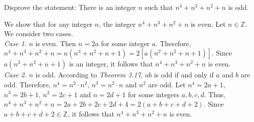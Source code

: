 \documentclass[12pt]{article}
\newcommand{\Z}{\mathbb{Z}}
\newenvironment{problem}[2][Problem]{\begin{trivlist}
		\item[\hskip \labelsep {\bfseries #1}\hskip \labelsep {\bfseries #2.}]}{\end{trivlist}}
\newenvironment{solution}[2][Solution]{\begin{trivlist}
		\item[\hskip \labelsep {\bfseries #1}\hskip \labelsep {\bfseries #2.}]}{\end{trivlist}}
\begin{document}
	\begin{problem}{51}
		Disprove the statement: There is an integer $n$ such that $n^{4}+n^{3}+n^{2}+n$ is odd.
		\begin{solution}{}
			We show that for any integer $n$, the integer $n^{4}+n^{3}+n^{2}+n$ is even. Let $n\in \Z$. We consider two cases.\\
			\textit{Case 1.} $n$ is even. Then $n =2a$ for some integer $a$. Therefore, $n^{4}+n^{3}+n^{2}+n = n(n^{3}+n^{2}+n+1) = 2[a(n^{2}+n^{2}+n+1)]$. Since $a(n^{2}+n^{2}+n+1)$ is an integer, it follows that $n^{4}+n^{3}+n^{2}+n$ is even.\\
			\textit{Case 2.} $n$ is odd. According to \textit{Theorem 3.17}, $ab$ is odd if and only if $a$ and $b$ are odd. Therefore, $n^{4}=n^{2}\cdot n^{2}$, $n^{3} = n^{2}\cdot n$ and $n^{2}$ are odd. Let $n^{4}=2a+1$, $n^{3}=2b+1$, $n^{2} = 2c+1$ and $n = 2d+1$ for some integers $a,b,c,d$. Thus, $n^{4}+n^{3}+n^{2}+n = 2a+2b+2c+2d+4=2(a+b+c+d+2)$. Since $a+b+c+d+2\in \Z$, it follows that $n^{4}+n^{3}+n^{2}+n$ is even.
		\end{solution}
	\end{problem}
\end{document}
